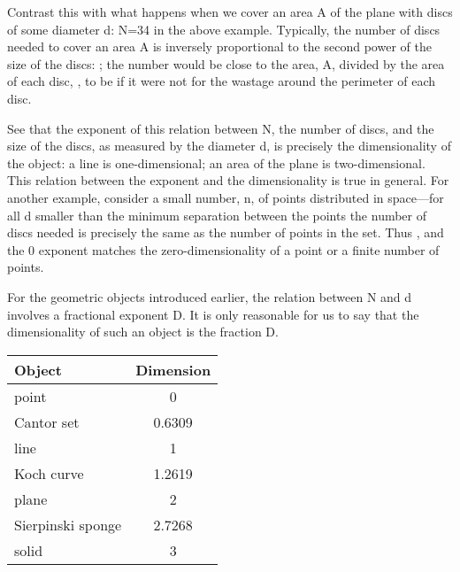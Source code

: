\documentclass[12pt,a5paper]{article}
\begin{document}
Contrast this with what happens when we cover an area A of the plane 
with discs of some diameter d: N=34 in the above example.  Typically, 
the number of discs needed to cover an area A is inversely 
proportional to the second power of the size of the discs: ;  the 
number would be close to the area, A, divided by the area of each 
disc, , to be  if it were not for the wastage around the perimeter 
of each disc.  

See that the exponent of this relation between N, the number of 
discs, and the size of the discs, as measured by the diameter d, is 
precisely the dimensionality of the object:  a line is 
one-dimensional;  an area of the plane is two-dimensional.  This 
relation between the exponent and the dimensionality is true in 
general.  For another example, consider a small number, n, of points 
distributed in space---for all d smaller than the minimum separation 
between the points the number of discs needed is precisely the same 
as the number of points in the set.  Thus  , and the 0 exponent 
matches the zero-dimensionality of a point or a finite number of 
points.  

For the geometric objects introduced earlier, the relation between N 
and d involves a fractional exponent D.  It is only reasonable for us 
to say that the dimensionality of such an object is the fraction D.
\begin{center}
	\begin{tabular}{lc}
		\hline
		Object & Dimension  \\
		\hline
		point & 0  \\
		Cantor set & 0.6309  \\
		line & 1  \\
		Koch curve & 1.2619  \\
		plane & 2  \\
		Sierpinski sponge & 2.7268  \\
		solid & 3  \\
		\hline
	\end{tabular}
\end{center}
\end{document}
